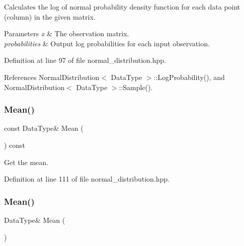 Calculates the log of normal probability density function for each data point (column) in the given matrix. 


\begin{DoxyParams}{Parameters}
{\em x} & The observation matrix. \\
\hline
{\em probabilities} & Output log probabilities for each input observation. \\
\hline
\end{DoxyParams}


Definition at line 97 of file normal\+\_\+distribution.\+hpp.



References Normal\+Distribution$<$ Data\+Type $>$\+::\+Log\+Probability(), and Normal\+Distribution$<$ Data\+Type $>$\+::\+Sample().

\mbox{\label{classmlpack_1_1ann_1_1NormalDistribution_ad742dbbc903032d3de5036c96942d19c}} 
\subsubsection{Mean()\hspace{0.1cm}{\footnotesize\ttfamily [1/2]}}
{\footnotesize\ttfamily const Data\+Type\& Mean (\begin{DoxyParamCaption}{ }\end{DoxyParamCaption}) const\hspace{0.3cm}{\ttfamily [inline]}}



Get the mean. 



Definition at line 111 of file normal\+\_\+distribution.\+hpp.

\mbox{\label{classmlpack_1_1ann_1_1NormalDistribution_ad45f7423a3ba9c77a3a092887709ce59}} 
\subsubsection{Mean()\hspace{0.1cm}{\footnotesize\ttfamily [2/2]}}
{\footnotesize\ttfamily Data\+Type\& Mean (\begin{DoxyParamCaption}{ }\end{DoxyParamCaption})\hspace{0.3cm}{\ttfamily [inline]}}



